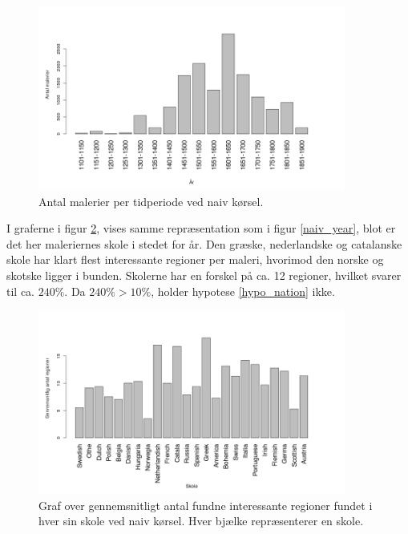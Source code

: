 {\begin{figure}[!h]
	\centering
	\includegraphics[angle=0,width=0.90\textwidth]{afsnit/resultater/billeder/yearNrImage.png}
	\caption{Antal malerier per tidperiode ved naiv kørsel.}
	\label{naiv_yearNrImage}
\end{figure}

I graferne i figur \ref{naiv_nation}, vises samme repræsentation som i
figur \ref{naiv_year}, blot er det her maleriernes skole i stedet for
år. Den græske, nederlandske og catalanske skole har klart flest
interessante regioner per maleri, hvorimod den norske og skotske ligger
i bunden.  Skolerne har en forskel på ca. 12 regioner, hvilket svarer
til ca.  $240\%$. Da $240 \% > 10 \%$, holder hypotese \ref{hypo_nation}
ikke.

\begin{figure}[!h]
	\centering
	\includegraphics[angle=0,width=0.90\textwidth]{afsnit/resultater/billeder/nationcut.png}
    \caption{Graf over gennemsnitligt antal fundne interessante regioner
    fundet i hver sin skole ved naiv kørsel. Hver bjælke
    repræsenterer en skole.}
	\label{naiv_nation}
\end{figure}

}

